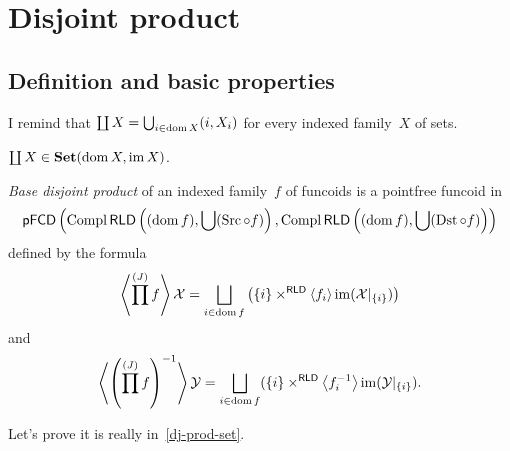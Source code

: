 \chapter{Disjoint product}

\section{Definition and basic properties}

I remind that
$\coprod X = \bigcup_{i\in\operatorname{dom} X} (i,X_i)$
for every indexed family~$X$ of sets.

\begin{obvious}
$\coprod X\in\mathbf{Set}(\operatorname{dom} X,\operatorname{im} X)$.
\end{obvious}

\begin{defn}
\emph{Base disjoint product} of an indexed family~$f$ of funcoids is
a pointfree funcoid in
\begin{equation}\label{dj-prod-set}
\mathsf{pFCD}\left(\operatorname{Compl}\mathsf{RLD}\left((\operatorname{dom} f),\bigcup(\operatorname{Src}\circ f)\right), \operatorname{Compl}\mathsf{RLD}\left((\operatorname{dom} f),\bigcup(\operatorname{Dst}\circ f)\right)\right)
\end{equation}
defined by the formula
\[
\supfun{\prod^{(J)}f} \mathcal{X} =
\bigsqcup_{i\in\dom f}
\left(\{i\}\times^{\mathsf{RLD}}\supfun{f_i}\im(\mathcal{X}|_{\{i\}})\right)
\]
and
\[
\supfun{\left(\prod^{(J)}f\right)^{-1}} \mathcal{Y} =
\bigsqcup_{i\in\dom f}
(\{i\}\times^{\mathsf{RLD}}\supfun{f_i^{-1}}\im(\mathcal{Y}|_{\{i\}}).
\]
\end{defn}

Let's prove it is really in~\eqref{dj-prod-set}.

